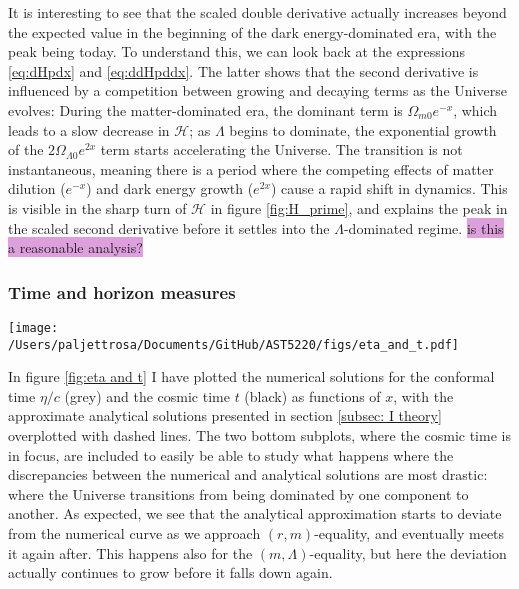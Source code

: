 \documentclass{aa}
\begin{document}
It is interesting to see that the scaled double derivative actually increases beyond the expected value in the beginning of the dark energy-dominated era, with the peak being today. To understand this, we can look back at the expressions \eqref{eq:dHpdx} and \eqref{eq:ddHpddx}. The latter shows that the second derivative is influenced by a competition between growing and decaying terms as the Universe evolves: During the matter-dominated era, the dominant term is $\Omega_{m0} e^{-x}$, which leads to a slow decrease in $\mathcal{H}$; as $\Lambda$ begins to dominate, the exponential growth of the $2\Omega_{\Lambda 0} e^{2x}$ term starts accelerating the Universe. The transition is not instantaneous, meaning there is a period where the competing effects of matter dilution ($e^{-x}$) and dark energy growth ($e^{2x}$) cause a rapid shift in dynamics. This is visible in the sharp turn of $\mathcal{H}$ in figure \ref{fig:H_prime}, and explains the peak in the scaled second derivative before it settles into the $\Lambda$-dominated regime. \colorbox{Plum}{is this a reasonable analysis?}


\subsubsection{Time and horizon measures}
\begin{figure*}
  \centering
  \texttt{[image: /Users/paljettrosa/Documents/GitHub/AST5220/figs/eta\_and\_t.pdf]}
  \caption{Conformal time $\eta(x)$ (grey) and cosmic time $t(x)$ (black) compared with analytical approximations (dashed). Deviations near equality points arise due to gradual transitions between dominant energy components. This is highlighted in the bottom subplots for the cosmic time.}\label{fig:eta and t}
\end{figure*}

In figure \ref{fig:eta and t} I have plotted the numerical solutions for the conformal time $\eta/c$ (grey) and the cosmic time $t$ (black) as functions of $x$, with the approximate analytical solutions presented in section \ref{subsec: I theory} overplotted with dashed lines. The two bottom subplots, where the cosmic time is in focus, are included to easily be able to study what happens where the discrepancies between the numerical and analytical solutions are most drastic: where the Universe transitions from being dominated by one component to another. As expected, we see that the analytical approximation starts to deviate from the numerical curve as we approach $(r,m)$-equality, and eventually meets it again after. This happens also for the $(m,\Lambda)$-equality, but here the deviation actually continues to grow before it falls down again.
\end{document}

